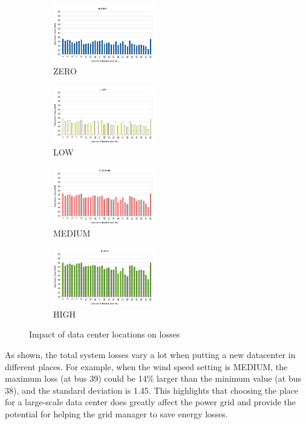 \begin{figure} [ht]
\begin{subfigure}[b]{.22\textwidth}
  \includegraphics[width=4.5cm]{img/loc-loss-zero}
  \caption{ZERO}
  \label{fig:a:l-l-zero}
\end{subfigure}
\hfill
\begin{subfigure}[b]{.22\textwidth}
  \includegraphics[width=4.5cm]{img/loc-loss-low-new}
  \caption{LOW}
   \label{fig:b:l-l-low}
\end{subfigure}
\begin{subfigure}[b]{.22\textwidth}
  \includegraphics[width=4.5cm]{img/loc-loss-mid-new}
  \caption{MEDIUM}
   \label{fig:c:l-l-mid}
\end{subfigure}
\hfill
\begin{subfigure}[b]{.22\textwidth}
  \includegraphics[width=4.5cm]{img/loc-loss-high-new}
  \caption{HIGH}
   \label{fig:d:l-l-high}
\end{subfigure}
\caption{Impact of data center locations on losses}
\label{fig:loc-loss}
\end{figure}


As shown, the total system losses vary a lot when putting a new datacenter in different places. For example, when the wind speed setting is MEDIUM, the maximum loss (at bus 39) could be 14\% larger than the minimum value (at bus 38), and the standard deviation is 1.45.  This highlights that choosing the place for a large-scale data center does greatly affect the power grid and provide the potential for helping the grid manager to save energy losses. 

